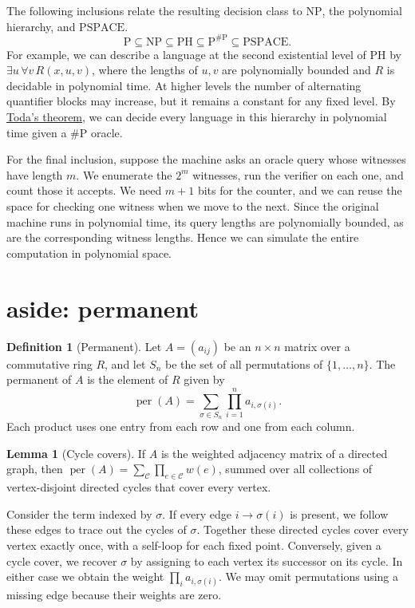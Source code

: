 \documentclass{article}
\theoremstyle{definition}
\newtheorem{lemma}[theorem]{Lemma}
\newtheorem{definition}[theorem]{Definition}
\DeclareMathOperator{\per}{per}
\begin{document}
The following inclusions relate the resulting decision class to
\(\mathrm{NP}\), the polynomial hierarchy, and \(\mathrm{PSPACE}\).
\[
   \mathrm P\subseteq\mathrm{NP}\subseteq\mathrm{PH}
       \subseteq\mathrm P^{\#\mathrm P}\subseteq\mathrm{PSPACE}.
\]
For example, we can describe a language at the second existential level
of \(\mathrm{PH}\) by
\(\exists u\,\forall v\,R(x,u,v)\), where the lengths of \(u,v\)
are polynomially bounded and \(R\) is decidable in polynomial time.
At higher levels the number of alternating quantifier blocks may
increase, but it remains a constant for any fixed level.
By \href{https://doi.org/10.1137/0220053}{Toda's theorem}, we can
decide every language in this hierarchy in polynomial time given a
\(\#\mathrm P\) oracle.

For the final inclusion, suppose the machine asks an oracle query
whose witnesses have length \(m\). We enumerate the \(2^m\) witnesses,
run the verifier on each one, and count those it accepts. We need
\(m+1\) bits for the counter, and we can reuse the space for checking
one witness when we move to the next. Since the original machine runs
in polynomial time, its query lengths are polynomially bounded, as are
the corresponding witness lengths. Hence we can simulate the entire
computation in polynomial space.

\section{aside: permanent}\label{sec:permanent}

\begin{definition}[Permanent]
Let \(A=(a_{ij})\) be an \(n\times n\) matrix over a commutative ring \(R\),
and let \(S_n\) be the set of all permutations of \(\{1,\ldots,n\}\).
The permanent of \(A\) is the element of \(R\) given by
\[
    \per(A)=\sum_{\sigma\in S_n}\prod_{i=1}^n a_{i,\sigma(i)}.
\]
Each product uses one entry from each row and one from each column.
\end{definition}

\begin{lemma}[Cycle covers]
If \(A\) is the weighted adjacency matrix of a directed graph, then
\(\per(A)=\sum_{\mathcal C}\prod_{e\in\mathcal C}w(e)\), summed over all
collections of vertex-disjoint directed cycles that cover every vertex.
\end{lemma}

Consider the term indexed by \(\sigma\). If every edge \(i\to\sigma(i)\)
is present, we follow these edges to trace out the cycles of
\(\sigma\). Together these directed cycles cover every vertex
exactly once, with a self-loop for each fixed point. Conversely, given a cycle cover, we
recover \(\sigma\) by assigning to each vertex its successor on its
cycle. In either case we obtain the weight \(\prod_i a_{i,\sigma(i)}\).
We may omit permutations using a missing edge because their weights
are zero.
\end{document}
